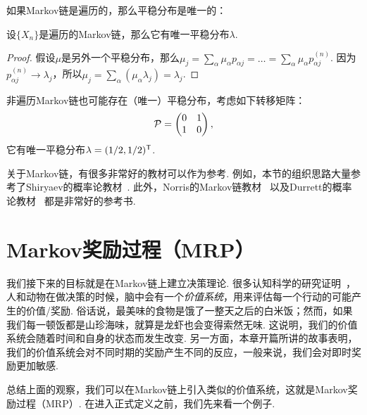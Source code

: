 如果Markov链是遍历的，那么平稳分布是唯一的：
\begin{proposition}\label{proposition:unique-stationary-distribution}
设$\{X_n\}$是遍历的Markov链，那么它有唯一平稳分布$\lambda$. 
\end{proposition}
    \begin{proof}
        假设$\mu$是另外一个平稳分布，那么$\mu_j=\sum_\alpha\mu_\alpha p_{\alpha j}=\dots=\sum_{\alpha}\mu_\alpha p_{\alpha j}^{(n)}$. 因为$p_{\alpha j}^{(n)}\to \lambda_j$，所以$\mu_j=\sum_{\alpha} (\mu_\alpha\lambda_j)=\lambda_j$.
    \end{proof}

非遍历Markov链也可能存在（唯一）平稳分布，考虑如下转移矩阵：
\[\mathcal P=\begin{pmatrix}0&1\\1&0\end{pmatrix},\]
它有唯一平稳分布$\lambda=(1/2,1/2)^{\mathsf{T}}$.

\begin{remark}
    关于Markov链，有很多非常好的教材可以作为参考. 例如，本节的组织思路大量参考了Shiryaev的概率论教材~\cite{shiryaevProbability1996}. 此外，Norris的Markov链教材~\cite{norrisMarkovChains1997} 以及Durrett的概率论教材~\cite{durrettProbabilityTheoryExamples2019} 都是非常好的参考书.
\end{remark}

\section{Markov奖励过程（MRP）}

我们接下来的目标就是在Markov链上建立决策理论. 很多认知科学的研究证明~\cite{gazzanigaCognitiveNeuroscienceBiology2018}，人和动物在做决策的时候，脑中会有一个\textit{价值系统}，用来评估每一个行动的可能产生的价值/奖励. 俗话说，最美味的食物是饿了一整天之后的白米饭；然而，如果我们每一顿饭都是山珍海味，就算是龙虾也会变得索然无味. 这说明，我们的价值系统会随着时间和自身的状态而发生改变. 另一方面，本章开篇所讲的故事表明，我们的价值系统会对不同时期的奖励产生不同的反应，一般来说，我们会对即时奖励更加敏感.

总结上面的观察，我们可以在Markov链上引入类似的价值系统，这就是Markov奖励过程（MRP）. 在进入正式定义之前，我们先来看一个例子.

